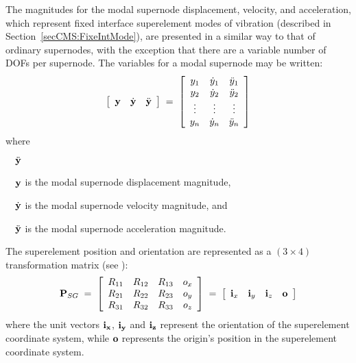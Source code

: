 {The magnitudes for the modal supernode displacement, velocity, and acceleration,
which represent fixed interface superelement modes of vibration
(described in Section~\ref{secCMS:FixeIntMode}), are presented in a similar way
to that of ordinary supernodes, with the exception that there are a variable
number of DOFs per supernode.
The variables for a modal supernode may be written:
%
\begin{equation}
\left[\begin{array}{ccc}
{\mf y} & \dot{\mf y} & \ddot{\mf y} \end{array}\right] \;=\;
\left[ \begin{array}{*{20}c}
y_1 & \dot{y}_1 & \ddot{y}_1 \\
y_2 & \dot{y}_2 & \ddot{y}_2 \\
\vdots & \vdots & \vdots \\
y_n & \dot{y}_n & \ddot{y}_n
\end{array} \right]
\label{eqK43:4}
\end{equation}
%
where
%
\begin{namelist}{$\quad\ddot{\bf y}$}
\item[$\quad{\bf y}$]      is the modal supernode displacement magnitude,
\item[$\quad\dot{\bf y}$]  is the modal supernode velocity magnitude, and
\item[$\quad\ddot{\bf y}$] is the modal supernode acceleration magnitude.
\end{namelist}

The superelement position and orientation are represented as a $(3\times4)$
transformation matrix (see ):
%
\begin{equation}
{\mf P}_{SG} \;=\; \left[ \begin{array}{*{20}c}
R_{11} & R_{12} & R_{13} & o_x \\
R_{21} & R_{22} & R_{23} & o_y \\
R_{31} & R_{32} & R_{33} & o_z \\
\end{array} \right] \;=\; \left[\begin{array}{cccc}
{\mf i}_x & {\mf i}_y & {\mf i}_z & {\mf o} \end{array}\right]
\label{eqK43:5}\end{equation}
%
where the unit vectors ${\bf i_x}$, ${\bf i_y}$ and ${\bf i_z}$ represent the
orientation of the superelement coordinate system, while ${\bf o}$ represents
the origin's position in the superelement coordinate system.

}
